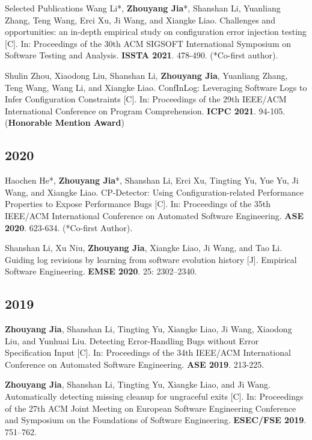 \documentclass{resume}
\begin{document}
\begin{rSection}{Selected Publications}
    Wang Li*, \textbf{Zhouyang Jia}*, Shanshan Li, Yuanliang Zhang, Teng Wang, Erci Xu, Ji Wang, and Xiangke Liao. Challenges and opportunities: an in-depth empirical study on configuration error injection testing [C]. In: Proceedings of the 30th ACM SIGSOFT International Symposium on Software Testing and Analysis. \textbf{ISSTA 2021}. 478-490. (*Co-first author).

    Shulin Zhou, Xiaodong Liu, Shanshan Li, \textbf{Zhouyang Jia}, Yuanliang Zhang, Teng Wang, Wang Li, and Xiangke Liao. ConfInLog: Leveraging Software Logs to Infer Configuration Constraints [C]. In: Proceedings of the 29th IEEE/ACM International Conference on Program Comprehension. \textbf{ICPC 2021}. 94-105. (\textbf{Honorable Mention Award})

    \subsection*{2020}

    Haochen He*, \textbf{Zhouyang Jia}*, Shanshan Li, Erci Xu, Tingting Yu, Yue Yu, Ji Wang, and Xiangke Liao. CP-Detector: Using Configuration-related Performance Properties to Expose Performance Bugs [C]. In: Proceedings of the 35th IEEE/ACM International Conference on Automated Software Engineering. \textbf{ASE 2020}. 623-634. (*Co-first Author).

    Shanshan Li, Xu Niu, \textbf{Zhouyang Jia}, Xiangke Liao, Ji Wang, and Tao Li. Guiding log revisions by learning from software evolution history [J]. Empirical Software Engineering. \textbf{EMSE 2020}. 25: 2302–2340.

    \subsection*{2019}

    \textbf{Zhouyang Jia}, Shanshan Li, Tingting Yu, Xiangke Liao, Ji Wang, Xiaodong Liu, and Yunhuai Liu. Detecting Error-Handling Bugs without Error Specification Input [C]. In: Proceedings of the 34th IEEE/ACM International Conference on Automated Software Engineering. \textbf{ASE 2019}. 213-225.

    \textbf{Zhouyang Jia}, Shanshan Li, Tingting Yu, Xiangke Liao, and Ji Wang. Automatically detecting missing cleanup for ungraceful exits [C]. In: Proceedings of the 27th ACM Joint Meeting on European Software Engineering Conference and Symposium on the Foundations of Software Engineering. \textbf{ESEC/FSE 2019}. 751–762.


\end{rSection}
\end{document}
